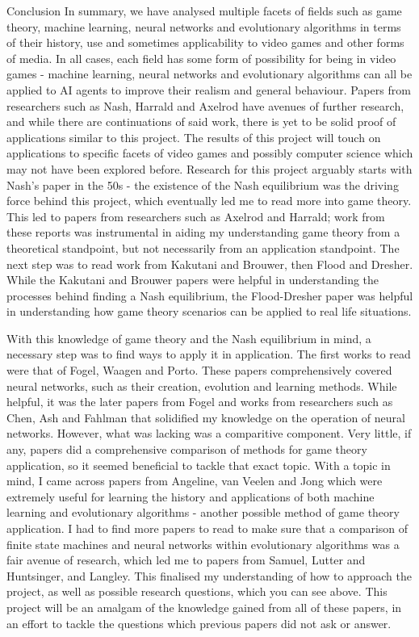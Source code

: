 \documentclass[12pt,a4paper]{article}
\makeatletter
\renewcommand\subsection{\@startsection {subsection}{1}{2mm}
                               {3pt plus 2pt minus 1pt}
                               {3pt plus 0pt}
                               {\normalfont\bfseries}}
\makeatother
\begin{document}
\subsection{Conclusion}
In summary, we have analysed multiple facets of fields such as game theory, machine learning, neural networks and evolutionary algorithms in terms of their history, use and sometimes applicability to video games and other forms of media. In all cases, each field has some form of possibility for being in video games - machine learning, neural networks and evolutionary algorithms can all be applied to AI agents to improve their realism and general behaviour. Papers from researchers such as Nash, Harrald and Axelrod have avenues of further research, and while there are continuations of said work, there is yet to be solid proof of applications similar to this project. The results of this project will touch on applications to specific facets of video games and possibly computer science which may not have been explored before. Research for this project arguably starts with Nash's paper in the 50s - the existence of the Nash equilibrium was the driving force behind this project, which eventually led me to read more into game theory. This led to papers from researchers such as Axelrod and Harrald; work from these reports was instrumental in aiding my understanding game theory from a theoretical standpoint, but not necessarily from an application standpoint. The next step was to read work from Kakutani and Brouwer, then Flood and Dresher. While the Kakutani and Brouwer papers were helpful in understanding the processes behind finding a Nash equilibrium, the Flood-Dresher paper was helpful in understanding how game theory scenarios can be applied to real life situations.

\noindent
With this knowledge of game theory and the Nash equilibrium in mind, a necessary step was to find ways to apply it in application. The first works to read were that of Fogel, Waagen and Porto. These papers comprehensively covered neural networks, such as their creation, evolution and learning methods. While helpful, it was the later papers from Fogel and works from researchers such as Chen, Ash and Fahlman that solidified my knowledge on the operation of neural networks. However, what was lacking was a comparitive component. Very little, if any, papers did a comprehensive comparison of methods for game theory application, so it seemed beneficial to tackle that exact topic. With a topic in mind, I came across papers from Angeline, van Veelen and Jong which were extremely useful for learning the history and applications of both machine learning and evolutionary algorithms - another possible method of game theory application. I had to find more papers to read to make sure that a comparison of finite state machines and neural networks within evolutionary algorithms was a fair avenue of research, which led me to papers from Samuel, Lutter and Huntsinger, and Langley. This finalised my understanding of how to approach the project, as well as possible research questions, which you can see above. This project will be an amalgam of the knowledge gained from all of these papers, in an effort to tackle the questions which previous papers did not ask or answer.
\end{document}
